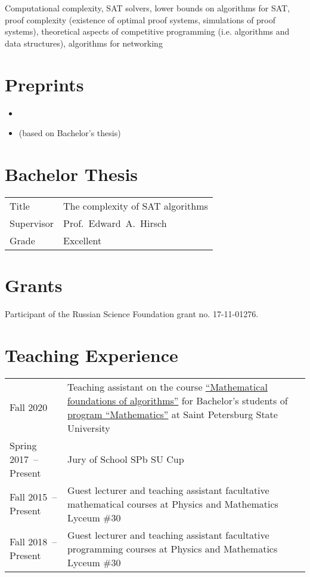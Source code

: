 \documentclass[a4paper, 11pt]{article}
\begin{document}
Computational complexity, SAT solvers, lower bounds on algorithms for SAT, proof complexity (existence of optimal proof systems, simulations of proof systems), theoretical aspects of competitive programming (i.e. algorithms and data structures), algorithms for networking

\section*{Preprints}

\begin{itemize}
    \item {}
    \item {} (based on Bachelor's thesis)
\end{itemize}

\section*{Bachelor Thesis}

\begin{tabularx}{\textwidth}{lX}
    Title & The complexity of SAT algorithms \\
    Supervisor & Prof.~Edward~A.~Hirsch \\
    Grade & Excellent
\end{tabularx}

\section*{Grants}

Participant of the Russian Science Foundation grant no. 17-11-01276.

\section*{Teaching Experience}

\begin{tabularx}{\textwidth}{lX}
    Fall 2020 & Teaching assistant on the course \href{https://users.math-cs.spbu.ru/~okhotin/teaching/algorithms_2020/}{``Mathematical foundations of algorithms''} for Bachelor's students of \href{https://math-cs.spbu.ru/en/}{program ``Mathematics''} at Saint Petersburg State University \\

    Spring 2017~-- Present & Jury of School SPb SU Cup \\

    Fall 2015~-- Present & Guest lecturer and teaching assistant facultative mathematical courses at Physics and Mathematics Lyceum \#30 \\
    
    Fall 2018~-- Present & Guest lecturer and teaching assistant facultative programming courses at Physics and Mathematics Lyceum \#30
\end{tabularx}
\end{document}
